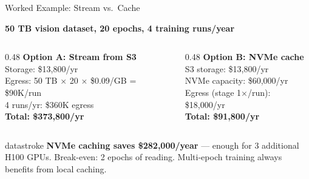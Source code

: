 \documentclass[aspectratio=169, 12pt]{beamer}
\begin{document}
\begin{frame}{Worked Example: Stream vs.\ Cache}

\footnotesize
\textbf{50 TB vision dataset, 20 epochs, 4 training runs/year}

\vspace{0.1cm}
\begin{columns}[T]
  \begin{column}{0.48\textwidth}
    \textbf{Option A: Stream from S3}\\[0.1cm]
    {\scriptsize
    Storage: \$13,800/yr\\
    Egress: 50 TB $\times$ 20 $\times$ \$0.09/GB = \$90K/run\\
    4 runs/yr: \$360K egress\\[0.05cm]
    \textbf{Total: \$373,800/yr}
    }
  \end{column}
  \begin{column}{0.48\textwidth}
    \textbf{Option B: NVMe cache}\\[0.1cm]
    {\scriptsize
    S3 storage: \$13,800/yr\\
    NVMe capacity: \$60,000/yr\\
    Egress (stage 1$\times$/run): \$18,000/yr\\[0.05cm]
    \textbf{Total: \$91,800/yr}
    }
  \end{column}
\end{columns}

\vspace{0.15cm}
\begin{mlsyscard}{datastroke}
{\scriptsize \textbf{NVMe caching saves \$282,000/year} --- enough for 3 additional H100 GPUs. Break-even: 2 epochs of reading. Multi-epoch training always benefits from local caching.}
\end{mlsyscard}

\end{frame}
\end{document}
